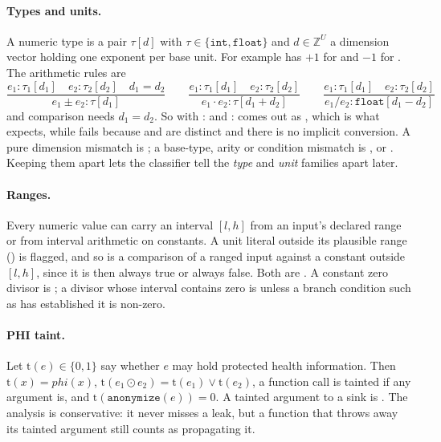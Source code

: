 \paragraph{Types and units.} A numeric type is a pair $\tau[d]$ with $\tau\in\{\texttt{int},\texttt{float}\}$ and
$d\in\mathbb{Z}^{U}$ a dimension vector holding one exponent per base unit. For example  has $+1$ for
 and $-1$ for . The arithmetic rules are
\begin{equation}
\frac{e_1:\tau_1[d_1]\quad e_2:\tau_2[d_2]\quad d_1=d_2}{e_1\pm e_2:\tau[d_1]}\qquad
\frac{e_1:\tau_1[d_1]\quad e_2:\tau_2[d_2]}{e_1\cdot e_2:\tau[d_1+d_2]}\qquad
\frac{e_1:\tau_1[d_1]\quad e_2:\tau_2[d_2]}{e_1/e_2:\texttt{float}[d_1-d_2]}
\end{equation}
and comparison needs $d_1=d_2$. So  with : and : comes out as
, which is what  expects, while  fails because  and  are
distinct and there is no implicit conversion. A pure dimension mismatch is ; a base-type, arity or
condition mismatch is ,  or . Keeping them apart lets the classifier tell the
\emph{type} and \emph{unit} families apart later.

\paragraph{Ranges.} Every numeric value can carry an interval $[l,h]$ from an input's declared range or from interval
arithmetic on constants. A unit literal outside its plausible range () is flagged, and so is a comparison
of a ranged input against a constant outside $[l,h]$, since it is then always true or always false. Both are
. A constant zero divisor is ; a divisor whose interval contains zero is  unless
a branch condition such as  has established it is non-zero.

\paragraph{PHI taint.} Let $\mathrm{t}(e)\in\{0,1\}$ say whether $e$ may hold protected health information. Then
$\mathrm{t}(x)=\mathit{phi}(x)$, $\mathrm{t}(e_1\odot e_2)=\mathrm{t}(e_1)\lor\mathrm{t}(e_2)$, a function call is
tainted if any argument is, and $\mathrm{t}(\texttt{anonymize}(e))=0$. A tainted argument to a sink is .
The analysis is conservative: it never misses a leak, but a function that throws away its tainted argument still counts
as propagating it.

